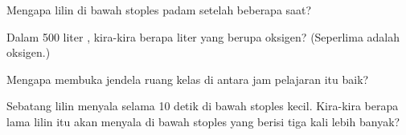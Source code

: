 \begin{exercise}[$\star$]\label{exo:g4:air-a-mixture-of-gases:8}
Mengapa lilin di bawah stoples padam setelah beberapa saat?
\end{exercise}

\begin{exercise}[$\star$]\label{exo:g4:air-a-mixture-of-gases:9}
Dalam 500 liter , kira-kira berapa liter yang berupa oksigen?
(Seperlima  adalah oksigen.)
\end{exercise}

\begin{exercise}[$\star\star$]\label{exo:g4:air-a-mixture-of-gases:10}
Mengapa membuka jendela ruang kelas di antara jam pelajaran itu baik?
\end{exercise}

\begin{exercise}[$\star\star$]\label{exo:g4:air-a-mixture-of-gases:11}
Sebatang lilin menyala selama 10 detik di bawah stoples kecil.
Kira-kira berapa lama lilin itu akan menyala di bawah stoples yang berisi
 tiga kali lebih banyak?
\end{exercise}
